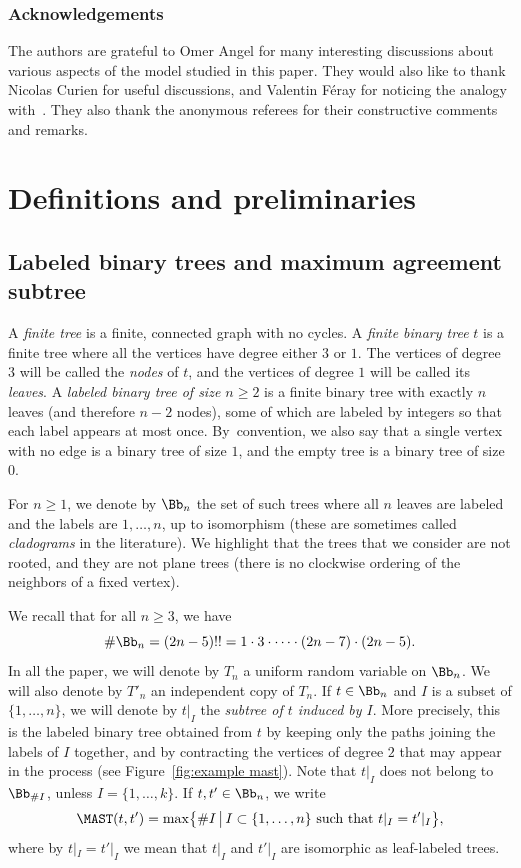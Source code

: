 \subsubsection*{Acknowledgements} The authors are grateful to Omer Angel
for many interesting discussions about various aspects of the model studied in this paper. They would also like to thank Nicolas Curien for useful discussions, and Valentin Féray for noticing the analogy with~\cite{BBDFGMP22, borga_power_2023}.
They also thank the anonymous referees for their constructive comments and remarks.

\section{Definitions and preliminaries}\label{sec:definitions and preliminaries}

\subsection{Labeled binary trees and maximum agreement subtree}\label{subsec_discrete_defns}

A \emph{finite tree} is a finite, connected graph with no cycles.
A \emph{finite binary tree} $t$ is a finite tree where all the vertices have degree either $3$ or $1$.
The vertices of degree $3$ will be called the \emph{nodes} of $t$, and the vertices of degree $1$ will be called its \emph{leaves}.
A \emph{labeled binary tree of size $n \geq 2$} is a finite binary tree with exactly $n$ leaves (and therefore $n-2$ nodes), some of which are labeled by integers so that each label appears at most once. By~convention, we also say that a single vertex with no edge is a binary tree of size $1$, and the empty tree is a binary tree of size $0$.

For $n \geq 1$, we denote by $\Bb_n$ the set of such trees where all $n$ leaves are labeled and the labels are $1, \dots, n$, up to isomorphism (these are sometimes called \emph{cladograms} in the literature).
We highlight that the trees that we consider are not rooted, and they are not plane trees (\ie there is no clockwise ordering of the neighbors of a fixed vertex).

We recall that for all $n \geq 3$, we have\vspace*{-3pt}
\[ \# \Bb_n = (2n-5)!!=1 \cdot 3 \cdot \dots \cdot (2n-7) \cdot (2n-5). \]
In all the paper, we will denote by $T_n$ a uniform random variable on $\Bb_n$.
We will also denote by $T'_n$ an independent copy of $T_n$. If $t \in \Bb_n$ and $I$ is a subset of $\{1,\dots,n\}$, we will denote by $t|_I$ the \emph{subtree of $t$ induced by $I$}.
More precisely, this is the labeled binary tree obtained from $t$ by keeping only the paths joining the labels of $I$ together, and by contracting the vertices of degree $2$ that may appear in the process (see Figure~\ref{fig:example mast}). Note that $t|_I$ does not belong to $\Bb_{\#I}$, unless $I=\{1,\dots,k\}$. If $t,t' \in \Bb_n$, we write\vspace*{-3pt}\enlargethispage{.5\baselineskip}
\[ \MAST(t,t')=\max \bigl\{ \#I \, \big|\, I \subset \{1,\dots,n\} \mbox{ such that } t|_I=t'|_I \bigr\},\]
where by $t|_I=t'|_I$ we mean that $t|_I$ and $t'|_I$ are isomorphic as leaf-labeled trees.

